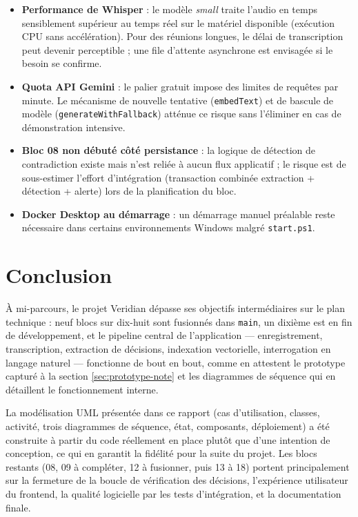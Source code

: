 \documentclass[12pt, a4paper]{article}
\begin{document}
\begin{itemize}
  \item \textbf{Performance de Whisper} : le modèle \textit{small} traite l'audio en temps sensiblement supérieur au temps réel sur le matériel disponible (exécution CPU sans accélération). Pour des réunions longues, le délai de transcription peut devenir perceptible ; une file d'attente asynchrone est envisagée si le besoin se confirme.
  \item \textbf{Quota API Gemini} : le palier gratuit impose des limites de requêtes par minute. Le mécanisme de nouvelle tentative (\texttt{embedText}) et de bascule de modèle (\texttt{generateWithFallback}) atténue ce risque sans l'éliminer en cas de démonstration intensive.
  \item \textbf{Bloc 08 non débuté côté persistance} : la logique de détection de contradiction existe mais n'est reliée à aucun flux applicatif ; le risque est de sous-estimer l'effort d'intégration (transaction combinée extraction + détection + alerte) lors de la planification du bloc.
  \item \textbf{Docker Desktop au démarrage} : un démarrage manuel préalable reste nécessaire dans certains environnements Windows malgré \texttt{start.ps1}.
\end{itemize}

\section{Conclusion}

À mi-parcours, le projet Veridian dépasse ses objectifs intermédiaires sur le plan technique : neuf blocs sur dix-huit sont fusionnés dans \texttt{main}, un dixième est en fin de développement, et le pipeline central de l'application — enregistrement, transcription, extraction de décisions, indexation vectorielle, interrogation en langage naturel — fonctionne de bout en bout, comme en attestent le prototype capturé à la section \ref{sec:prototype-note} et les diagrammes de séquence qui en détaillent le fonctionnement interne.

La modélisation UML présentée dans ce rapport (cas d'utilisation, classes, activité, trois diagrammes de séquence, état, composants, déploiement) a été construite à partir du code réellement en place plutôt que d'une intention de conception, ce qui en garantit la fidélité pour la suite du projet. Les blocs restants (08, 09 à compléter, 12 à fusionner, puis 13 à 18) portent principalement sur la fermeture de la boucle de vérification des décisions, l'expérience utilisateur du frontend, la qualité logicielle par les tests d'intégration, et la documentation finale.
\end{document}
